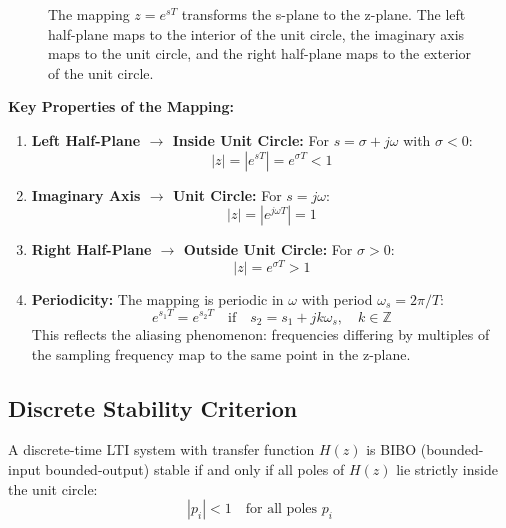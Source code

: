 \begin{figure}[H]
\caption{The mapping $z = e^{sT}$ transforms the s-plane to the z-plane. The left half-plane maps to the interior of the unit circle, the imaginary axis maps to the unit circle, and the right half-plane maps to the exterior of the unit circle.}
\label{fig:s_to_z_mapping}
\end{figure}

\textbf{Key Properties of the Mapping:}

\begin{enumerate}
    \item \textbf{Left Half-Plane $\to$ Inside Unit Circle:} For $s = \sigma + j\omega$ with $\sigma < 0$:
    \begin{equation}
    |z| = |e^{sT}| = e^{\sigma T} < 1
    \end{equation}

    \item \textbf{Imaginary Axis $\to$ Unit Circle:} For $s = j\omega$:
    \begin{equation}
    |z| = |e^{j\omega T}| = 1
    \end{equation}

    \item \textbf{Right Half-Plane $\to$ Outside Unit Circle:} For $\sigma > 0$:
    \begin{equation}
    |z| = e^{\sigma T} > 1
    \end{equation}

    \item \textbf{Periodicity:} The mapping is periodic in $\omega$ with period $\omega_s = 2\pi/T$:
    \begin{equation}
    e^{s_1 T} = e^{s_2 T} \quad \text{if} \quad s_2 = s_1 + jk\omega_s, \quad k \in \mathbb{Z}
    \end{equation}
    This reflects the aliasing phenomenon: frequencies differing by multiples of the sampling frequency map to the same point in the z-plane.
\end{enumerate}

\subsection{Discrete Stability Criterion}

\begin{theorem}
A discrete-time LTI system with transfer function $H(z)$ is BIBO (bounded-input bounded-output) stable if and only if all poles of $H(z)$ lie strictly inside the unit circle:
\begin{equation}
|p_i| < 1 \quad \text{for all poles } p_i
\end{equation}
\end{theorem}

